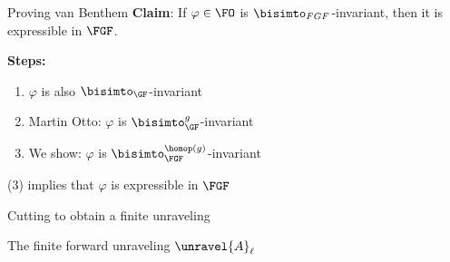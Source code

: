 \documentclass[aspectratio=169]{beamer}
\begin{document}
\begin{frame}{Proving van Benthem}
  \textbf{Claim}: If $\varphi \in \FO$ is $\bisimto_{FGF}$-invariant, then it is expressible in $\FGF$.\\[3ex]

  \begin{minipage}[t]{0.5\framewidth}
    \textbf{Steps:}
    \vspace{1ex}
    \begin{enumerate}
      \itemsep1ex
      \item $\varphi$ is also $\bisimto_{\GF}$-invariant
      \item Martin Otto: $\varphi$ is $\bisimto_{\GF}^{g}$-invariant
      \item We show: $\varphi$ is $\bisimto_{\FGF}^{\homop(g)}$-invariant
    \end{enumerate}
    \vspace{1ex}
    {(3)} implies that $\varphi$ is expressible in $\FGF$
  \end{minipage}
  \pause
  
\end{frame}

\begin{frame}{Cutting to obtain a finite unraveling}
  \begin{center}
    
  \end{center}
\end{frame}

\begin{frame}{The finite forward unraveling $\unravel{A}_{\ell}$}
  
\end{frame}

{
}
\end{document}
